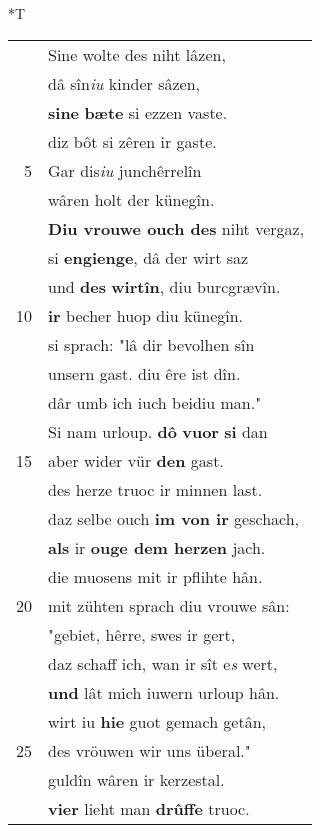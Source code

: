 \documentclass[8pt,a4paper,notitlepage]{article}
\begin{document}
\begin{table}[ht]
\begin{minipage}[t]{0.5\linewidth}
\end{minipage}
\hspace{0.5cm}
\begin{minipage}[t]{0.5\linewidth}
\small
\begin{center}*T
\end{center}
\begin{tabular}{rl}
 & Sine wolte des niht lâzen,\\ 
 & dâ sîn\textit{iu} kinder sâzen,\\ 
 & \textbf{si}\textbf{ne} \textbf{bæte} si ezzen vaste.\\ 
 & diz bôt si zêren ir gaste.\\ 
5 & Gar dis\textit{iu} junchêrrelîn\\ 
 & wâren holt der künegîn.\\ 
 & \textbf{Diu vrouwe ouch des} niht vergaz,\\ 
 & si \textbf{en}\textbf{gienge}, dâ der wirt saz\\ 
 & und \textbf{des} \textbf{wirtîn}, diu burcgrævîn.\\ 
10 & \textbf{ir} becher huop diu künegîn.\\ 
 & si sprach: "lâ dir bevolhen sîn\\ 
 & unsern gast. diu êre ist dîn.\\ 
 & dâr umb ich iuch beidiu man."\\ 
 & Si nam urloup. \textbf{dô} \textbf{vuor} \textbf{si} dan\\ 
15 & aber wider vür \textbf{den} gast.\\ 
 & des herze truoc ir minnen last.\\ 
 & daz selbe ouch \textbf{im von ir} geschach,\\ 
 & \textbf{als} ir \textbf{ouge dem herzen} jach.\\ 
 & die muosens mit ir pflihte hân.\\ 
20 & mit zühten sprach diu vrouwe sân:\\ 
 & "gebiet, hêrre, swes ir gert,\\ 
 & daz schaff ich, wan ir sît e\textit{s} wert,\\ 
 & \textbf{und} lât mich iuwern urloup hân.\\ 
 & wirt iu \textbf{hie} guot gemach getân,\\ 
25 & des vröuwen wir uns überal."\\ 
 & guldîn wâren ir kerzestal.\\ 
 & \textbf{vier} lieht man \textbf{drûffe} truoc.\\ 

\end{tabular}
\end{minipage}
\end{table}
\end{document}
